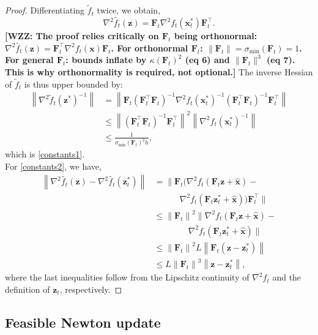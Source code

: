 \documentclass[journal,twoside,web]{ieeecolor}
\newcommand{\norm}[1]{\left\lVert#1\right\rVert}
\newcommand{\xx}{\mathbf{x}}
\newcommand{\zz}{\mathbf{z}}
\newcommand{\FF}{\mathbf{F}}
\newcommand{\FFt}{\mathbf{F}_t}
\newcommand{\xh}{\mathbf{\hat{x}}}
\newcommand{\WZZsuggestion}[1]{{\color{green2}\bf{[WZZ: #1]}}}
\begin{document}
\noindent\begin{proof}
Differentiating $\tilde{f}_t$ twice, we obtain,
\[\nabla^2\tilde{f_t}(\zz) = \FF_t\nabla^2f_t(\xx_t^*)\FF_t^\top.\]
\WZZsuggestion{The proof relies critically on $\FF_t$ being orthonormal:
$\nabla^2\tilde{f_t}(\zz) = \FF_t^\top\nabla^2f_t(\xx)\FF_t$.
For orthonormal $\FF_t$: $\|\FF_t\| = \sigma_{\min}(\FF_t) = 1$.
For general $\FF_t$: bounds inflate by $\kappa(\FF_t)^2$ (eq 6) and $\|\FF_t\|^3$ (eq 7).
This is why orthonormality is required, not optional.} 
The inverse Hessian of $\tilde{f}_t$ is thus upper bounded by:
\begin{align*}
    \norm{\nabla^2\tilde{f}_t(\zz^*)^{-1}} &= \norm{\FFt(\FFt^\top\FFt)^{-1}\nabla^2f_t(\xx_t^*)^{-1}(\FFt^\top\FFt)^{-1}\FFt^\top}\\
    &\le \norm{(\FFt^\top\FFt)^{-1}\FFt^\top}^2\norm{\nabla^2f_t(\xx_t^*)^{-1}}%
    \\
    &\le \frac{1}{\sigma_{\min}(\FFt)^2h},
\end{align*}
which is \eqref{constants1}.\\
For \eqref{constants2}, we have,
\begin{align*}
    \norm{\nabla^2\tilde{f_t}(\zz)-\nabla^2\tilde{f_t}(\zz_t^*)} &= \big\|\FFt\big(\nabla^2f_t(\FFt\zz+\xh)-\\&\quad\quad\quad\nabla^2f_t(\FFt\zz^*_t+\xh)\big)\FFt^{\top}\big\|\\
    &\le \norm{\FFt}^2\big\|\nabla^2f_t(\FFt\zz+\xh)-\\&\quad\quad\quad\quad\nabla^2f_t(\FFt\zz^*_t+\xh)\big\|\\
    \quad\quad\quad\quad\quad&\le \norm{\FFt}^2 L\norm{\FFt(\zz-\zz^*_t)}\\
    &\le L\norm{\FFt}^3\norm{\zz-\zz^*_t},
\end{align*}
where the last inequalities follow from the Lipschitz continuity of $\nabla^2f_t$ and the definition of $\zz_t$, respectively.
\end{proof}


\subsection{Feasible Newton update}
\end{document}
